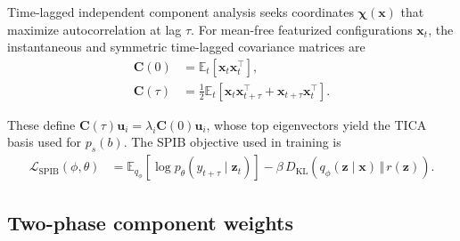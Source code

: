 Time-lagged independent component analysis seeks coordinates $\boldsymbol\chi(\mathbf{x})$ that maximize autocorrelation at lag $\tau$.\cite{perezhernandez2013tica,schwantes2013improvements}
For mean-free featurized configurations $\mathbf{x}_t$, the instantaneous and symmetric time-lagged covariance matrices are
\begin{equation}
\begin{split}
    \mathbf{C}(0) &= \mathbb{E}_t\!\left[\mathbf{x}_t \mathbf{x}_t^{\top}\right],\\
    \mathbf{C}(\tau) &= \tfrac{1}{2}\mathbb{E}_t\!\left[\mathbf{x}_t \mathbf{x}_{t+\tau}^{\top} + \mathbf{x}_{t+\tau} \mathbf{x}_t^{\top}\right].
\end{split}
    \label{eq:si_tica_covariances}
\end{equation}
These define $\mathbf{C}(\tau)\mathbf{u}_i = \lambda_i \mathbf{C}(0)\mathbf{u}_i$, whose top eigenvectors yield the TICA basis used for $p_s(b)$.
The SPIB objective used in training is
\begin{equation}
\begin{split}
    \mathcal{L}_{\mathrm{SPIB}}(\phi,\theta) &=
    \mathbb{E}_{q_\phi}\!\left[\log p_\theta(y_{t+\tau}\mid \mathbf{z}_t)\right]
     - \beta\,D_{\mathrm{KL}}\!\left(q_\phi(\mathbf{z}\mid\mathbf{x})\,\Vert\,r(\mathbf{z})\right).
\end{split}
    \label{eq:si_spib_loss}
\end{equation}

\subsection*{Two-phase component weights}

